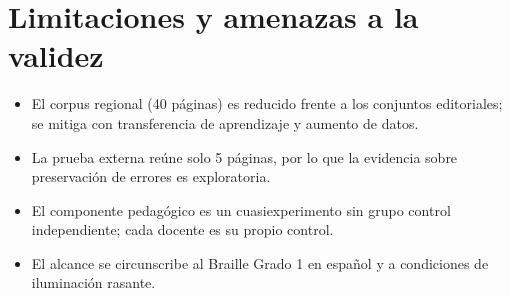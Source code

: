 \section{Limitaciones y amenazas a la validez}

\begin{itemize}
  \item El corpus regional (40 páginas) es reducido frente a los conjuntos
  editoriales; se mitiga con transferencia de aprendizaje y aumento de datos.
  \item La prueba externa reúne solo 5 páginas, por lo que la evidencia sobre
  preservación de errores es exploratoria.
  \item El componente pedagógico es un cuasiexperimento sin grupo control
  independiente; cada docente es su propio control.
  \item El alcance se circunscribe al Braille Grado 1 en español y a condiciones
  de iluminación rasante.
\end{itemize}
